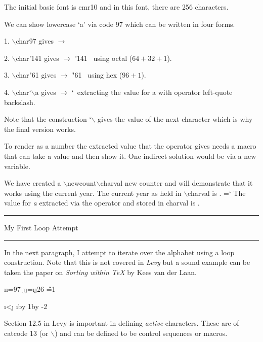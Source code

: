 

The initial basic font is cmr10 and in this font, there are 256 characters.

We can show lowercase `a' via code 97 which can be written in four forms.

\item 1. $\backslash $char{97} gives $\longrightarrow$ 
\item 2. $\backslash $char{'141} gives $\longrightarrow$ \char'141 \ using octal ($64+32+1$).
\item 3. $\backslash $char{"61} gives $\longrightarrow$ \char"61 \ using hex ($96+1$).
\item 4. $\backslash $char{`$\backslash$a} gives $\longrightarrow$ \char`\a \ extracting the value for a with operator left-quote backslash.

Note that the construction `$\backslash$ gives the value of the next character which is
why the final version works.

To render as a number the extracted value that the operator gives needs a macro that
can take a value and then show it.  One indirect solution would be via a new variable.

\newcount\charval
We have created a $\backslash$newcount$\backslash$charval new counter and will
demonstrate that it works using the current year.
The current year as held in $\backslash$charval is \the\charval.
\charval=`\a
The value for {\it a} extracted via the operator and stored in charval is \the\charval.


\medskip
\hrule
My First Loop Attempt
\hrule

In the next paragraph, I attempt to iterate over the alphabet using a loop construction.
Note that this is not covered in {\it Levy} but a sound example can be taken the paper on 
{\it Sorting within \TeX} by Kees van der Laan.

\newcount\i\i=97
\newcount\j\j=\i\advance\j26
\newcount\alphapos{}
\newcount\a{}
\newcount\v\v=1
\newcount\veegap{}

{\loop\ifnum \i<\j%
%
\advance\i by 1\advance{}\advance\veegap by -2\repeat}

Section 12.5 in Levy is important in defining {\it active} characters.  These are of
catcode 13 (or $\backslash$\active) and can be defined to be control sequences or macros.


\bye
